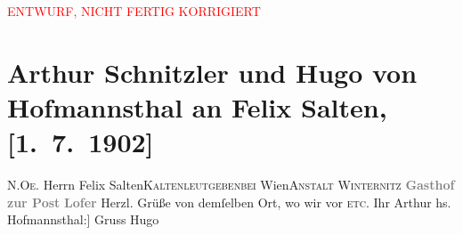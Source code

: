 
\begin{center}
            \textcolor{red}{ENTWURF, NICHT FERTIG KORRIGIERT}
                      \end{center}
            
         
         \renewcommand{\erwaehntePersonen}{Personen: Felix Salten}
         \renewcommand{\erwaehnteOrte}{Orte: Gasthof zur Post, Kaltenleutgeben, Kaltwasserheilanstalt Winternitz, Lofer, Niederösterreich, Wien}
         \renewcommand{\erwaehnteWerke}{}
               \section[Arthur Schnitzler und Hugo von Hofmannsthal an Felix Salten, {[}1. 7. 1902{]}]{ Arthur Schnitzler und Hugo von Hofmannsthal an Felix Salten,
               {[}1. 7. 1902{]}}\nopagebreak{}\rehead{ }\begin{ledgroupsized}[t]{13cm}\normalsize\beginnumbering \toendnotes[C]{\smallbreak\pagebreak[2]} 
\toendnotes[C]{\smallbreak}\pstart{}{\pb}\textsc{N.Oe. }\pend{}\pstart{}Herrn Felix Salten\pend{}\pstart{}\textsc{Kaltenleutgeben}\pend{}\pstart{}\textsc{bei}{ }Wien\pend{}\pstart{}\textsc{Anstalt Winternitz}\pend{}{\bigskip}\pstart
           \noindent{}\centering{}{\pb}\textcolor{gray}{\textbf{Gasthof zur Post}}\pend
           \pstart
           \noindent{}\centering{}\textcolor{gray}{\textbf{Lofer}}\pend
           \pstart
           Herzl. Grüße von demſelben Ort, wo wir vor \label{K_L02977-1v}\label{K_L02977-1h}{ }\textsc{etc.}\pend
           \pstart Ihr \spacefill\mbox{Arthur}\pend{}\pstart
           \noindent{}{[}hs. Hofmannsthal:{]} Gruss \spacefill\mbox{Hugo}\pend
           
         
         \endnumbering{}\end{ledgroupsized}\begin{anhang}\end{anhang}\newcommand{\dateiname}{L02977}\newcommand{\titel}{Arthur Schnitzler und Hugo von Hofmannsthal an Felix Salten, [1. 7. 1902]}\newcommand{\editorInnen}{Martin Anton Müller und Laura Untner}
      